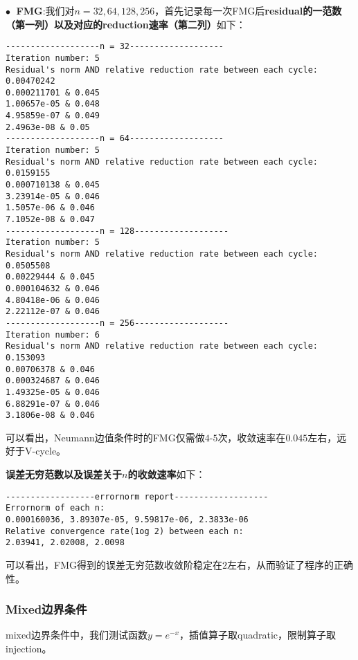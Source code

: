 \documentclass{ctexart}
\begin{document}
\begin{sloppypar}
$\bullet \;$ \textbf{FMG}:我们对$n=32,64,128,256$，首先记录每一次FMG后\textbf{residual的一范数（第一列）以及对应的reduction速率（第二列）}如下：
\begin{shaded}
\begin{verbatim}
-------------------n = 32-------------------
Iteration number: 5
Residual's norm AND relative reduction rate between each cycle: 
0.00470242
0.000211701 & 0.045
1.00657e-05 & 0.048
4.95859e-07 & 0.049
2.4963e-08 & 0.05
-------------------n = 64-------------------
Iteration number: 5
Residual's norm AND relative reduction rate between each cycle: 
0.0159155
0.000710138 & 0.045
3.23914e-05 & 0.046
1.5057e-06 & 0.046
7.1052e-08 & 0.047
-------------------n = 128-------------------
Iteration number: 5
Residual's norm AND relative reduction rate between each cycle: 
0.0505508
0.00229444 & 0.045
0.000104632 & 0.046
4.80418e-06 & 0.046
2.22112e-07 & 0.046
-------------------n = 256-------------------
Iteration number: 6
Residual's norm AND relative reduction rate between each cycle: 
0.153093
0.00706378 & 0.046
0.000324687 & 0.046
1.49325e-05 & 0.046
6.88291e-07 & 0.046
3.1806e-08 & 0.046
\end{verbatim}
\end{shaded}
可以看出，Neumann边值条件时的FMG仅需做$4$-$5$次，收敛速率在$0.045$左右，远好于V-cycle。

\textbf{误差无穷范数以及误差关于$n$的收敛速率}如下：
\begin{shaded}
\begin{verbatim}
------------------errornorm report-------------------
Errornorm of each n: 
0.000160036, 3.89307e-05, 9.59817e-06, 2.3833e-06 
Relative convergence rate(1og 2) between each n: 
2.03941, 2.02008, 2.0098
\end{verbatim} 
\end{shaded}
可以看出，FMG得到的误差无穷范数收敛阶稳定在$2$左右，从而验证了程序的正确性。

\subsubsection{Mixed边界条件}
mixed边界条件中，我们测试函数$y=e^{-x}$，插值算子取quadratic，限制算子取injection。


\end{sloppypar}
\end{document}
